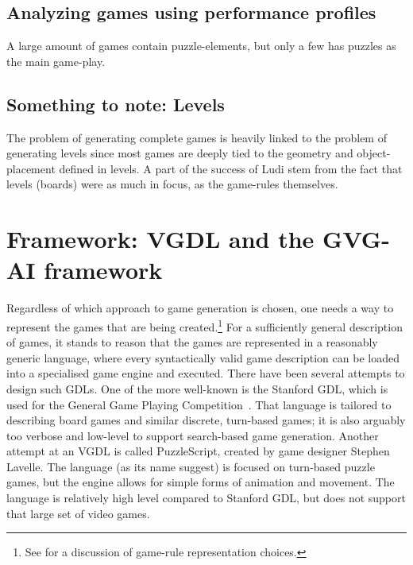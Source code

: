 \documentclass[a4paper,titlepage,final]{report}
\begin{document}
\subsection{Analyzing games using performance profiles}
A large amount of games contain puzzle-elements, but only a few has puzzles as the main game-play.


\subsection{Something to note: Levels}
\label{ssec_notelevels}
The problem of generating complete games is heavily linked to the problem of generating levels since most games are deeply tied to the geometry and object-placement defined in levels.
A part of the success of Ludi stem from the fact that levels (boards) were as much in focus, as the game-rules themselves.





\section{Framework: VGDL and the GVG-AI framework}
Regardless of which approach to game generation is chosen, one needs a way to represent the games that are being created.\footnote{See \citet{pcgbook:ch6} for a discussion of game-rule representation choices.} For a sufficiently general description of games, it stands to reason that the games are represented in a reasonably generic language, where every syntactically valid game description can be loaded into a specialised game engine and executed. 
There have been several attempts to design such GDLs. One of the more well-known is the Stanford GDL, which is used for the General Game Playing Competition~\citet{genesereth2005general}. That language is tailored to describing board games and similar discrete, turn-based games; it is also arguably too verbose and low-level to support search-based game generation. 
Another attempt at an VGDL is called PuzzleScript, created by game designer Stephen Lavelle. The language (as its name suggest) is focused on turn-based puzzle games, but the engine allows for simple forms of animation and movement. The language is relatively high level compared to Stanford GDL, but does not support that large set of video games.
\end{document}
